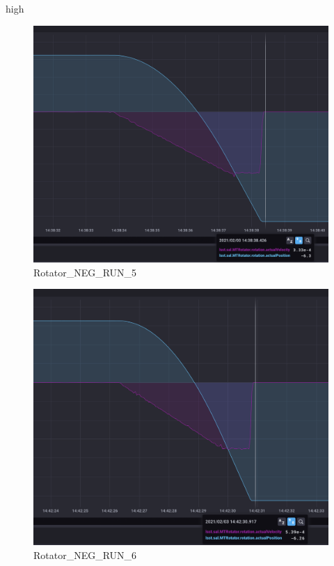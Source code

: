 high\documentclass[SE,lsstdraft,authoryear,toc]{lsstdoc}
\begin{document}
\begin{figure}[h!]
  \includegraphics[width=\linewidth]{media/Rotator_design_speed_neg_test5.png}
  \caption{Rotator\_NEG\_RUN\_5}
  \label{fig:Rotator_NEG_RUN_5}
\end{figure}
\begin{figure}[h!]
  \includegraphics[width=\linewidth]{media/Rotator_design_speed_neg_test6.png}
  \caption{Rotator\_NEG\_RUN\_6}
  \label{fig:Rotator_NEG_RUN_6}
\end{figure}
\end{document}
